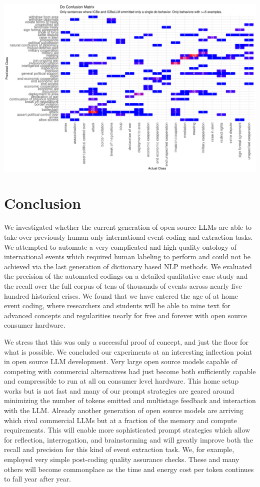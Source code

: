 \documentclass[
]{article}
\begin{document}
\includegraphics{arxiv_Douglass_et_al_2024_ICBeLLM_files/figure-pdf/unnamed-chunk-13-1.pdf}

\section{Conclusion}\label{conclusion}

We investigated whether the current generation of open source LLMs are
able to take over previously human only international event coding and
extraction tasks. We attempted to automate a very complicated and high
quality ontology of international events which required human labeling
to perform and could not be achieved via the last generation of
dictionary based NLP methods. We evaluated the precision of the
automated codings on a detailed qualitative case study and the recall
over the full corpus of tens of thousands of events across nearly five
hundred historical crises. We found that we have entered the age of at
home event coding, where researchers and students will be able to mine
text for advanced concepts and regularities nearly for free and forever
with open source consumer hardware.

We stress that this was only a successful proof of concept, and just the
floor for what is possible. We concluded our experiments at an
interesting inflection point in open source LLM development. Very large
open source models capable of competing with commercial alternatives had
just become both sufficiently capable and compressible to run at all on
consumer level hardware. This home setup works but is not fast and many
of our prompt strategies are geared around minimizing the number of
tokens emitted and multistage feedback and interaction with the LLM.
Already another generation of open source models are arriving which
rival commercial LLMs but at a fraction of the memory and compute
requirements. This will enable more sophisticated prompt strategies
which allow for reflection, interrogation, and brainstorming and will
greatly improve both the recall and precision for this kind of event
extraction task. We, for example, employed very simple post-coding
quality assurance checks. These and many others will become commonplace
as the time and energy cost per token continues to fall year after year.
\end{document}
